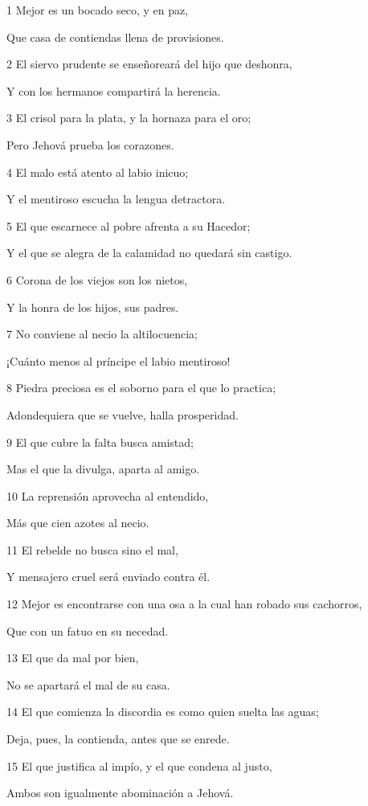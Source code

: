 \par 1 Mejor es un bocado seco, y en paz,
\par Que casa de contiendas llena de provisiones.
\par 2 El siervo prudente se enseñoreará del hijo que deshonra,
\par Y con los hermanos compartirá la herencia.
\par 3 El crisol para la plata, y la hornaza para el oro;
\par Pero Jehová prueba los corazones.
\par 4 El malo está atento al labio inicuo;
\par Y el mentiroso escucha la lengua detractora.
\par 5 El que escarnece al pobre afrenta a su Hacedor;
\par Y el que se alegra de la calamidad no quedará sin castigo.
\par 6 Corona de los viejos son los nietos,
\par Y la honra de los hijos, sus padres.
\par 7 No conviene al necio la altilocuencia;
\par ¡Cuánto menos al príncipe el labio mentiroso!
\par 8 Piedra preciosa es el soborno para el que lo practica;
\par Adondequiera que se vuelve, halla prosperidad.
\par 9 El que cubre la falta busca amistad;
\par Mas el que la divulga, aparta al amigo.
\par 10 La reprensión aprovecha al entendido,
\par Más que cien azotes al necio.
\par 11 El rebelde no busca sino el mal,
\par Y mensajero cruel será enviado contra él.
\par 12 Mejor es encontrarse con una osa a la cual han robado sus cachorros,
\par Que con un fatuo en su necedad.
\par 13 El que da mal por bien,
\par No se apartará el mal de su casa.
\par 14 El que comienza la discordia es como quien suelta las aguas; 
\par Deja, pues, la contienda, antes que se enrede.
\par 15 El que justifica al impío, y el que condena al justo,
\par Ambos son igualmente abominación a Jehová.
